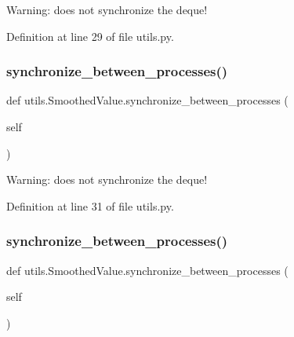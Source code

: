 \begin{DoxyVerb}Warning: does not synchronize the deque!
\end{DoxyVerb}
 

Definition at line 29 of file utils.\+py.

\mbox{\label{classutils_1_1SmoothedValue_a8d10c867abf46adb6b0be5b6adcf1236}} 
\subsubsection{\texorpdfstring{synchronize\+\_\+between\+\_\+processes()}{synchronize\_between\_processes()}\hspace{0.1cm}{\footnotesize\ttfamily [4/5]}}
{\footnotesize\ttfamily def utils.\+Smoothed\+Value.\+synchronize\+\_\+between\+\_\+processes (\begin{DoxyParamCaption}\item[{}]{self }\end{DoxyParamCaption})}

\begin{DoxyVerb}Warning: does not synchronize the deque!
\end{DoxyVerb}
 

Definition at line 31 of file utils.\+py.

\mbox{\label{classutils_1_1SmoothedValue_a8d10c867abf46adb6b0be5b6adcf1236}} 
\subsubsection{\texorpdfstring{synchronize\+\_\+between\+\_\+processes()}{synchronize\_between\_processes()}\hspace{0.1cm}{\footnotesize\ttfamily [5/5]}}
{\footnotesize\ttfamily def utils.\+Smoothed\+Value.\+synchronize\+\_\+between\+\_\+processes (\begin{DoxyParamCaption}\item[{}]{self }\end{DoxyParamCaption})}

